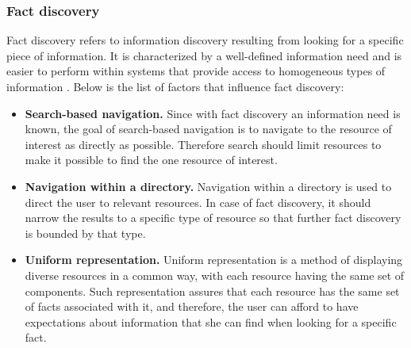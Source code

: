 \documentclass{casconpaper}
\begin{document}
{\subsubsection{Fact discovery}
Fact discovery refers to information discovery resulting from looking for a specific piece of information. It is characterized by a well-defined information need and is easier to perform within systems that provide access to homogeneous types of information \cite{kellar2006, lindley}. Below is the list of factors that influence fact discovery: 
\begin{itemize}
  \item \textbf{Search-based navigation.} Since with fact discovery an information need is known, the goal of search-based navigation is to navigate to the resource of interest as directly as possible. Therefore search should limit resources to make it possible to find the one resource of interest. 
  \item \textbf{Navigation within a directory.} Navigation within a directory is used to direct the user to relevant resources. In case of fact discovery, it should narrow the results to a specific type of resource so that further fact discovery is bounded by that type. 
  \item \textbf{Uniform representation.} Uniform representation is a method of displaying diverse resources in a common way, with each resource having the same set of components. Such representation assures that each resource has the same set of facts associated with it, and therefore, the user can afford to have expectations about information that she can find when looking for a specific fact.
\end{itemize}

} %
\end{document}
